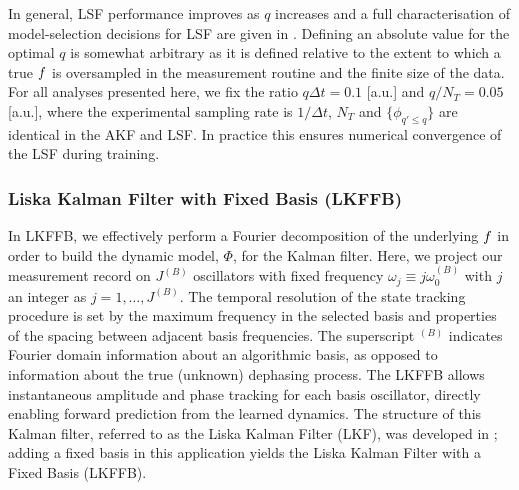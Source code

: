 In general, LSF performance improves as $q$ increases and a full characterisation of model-selection decisions for LSF are given in \cite{mavadia2017}. Defining an absolute value for the optimal $q$ is somewhat arbitrary as it is defined relative to the extent to which a true $f$ is oversampled in the measurement routine and the finite size of the data. For all analyses presented here, we fix the ratio $q \Delta t = 0.1 $ [a.u.] and $q / N_T = 0.05$ [a.u.], where the experimental sampling rate is $1/\Delta t$, $N_T$ and $\{\phi_{q' \leq q}\}$ are identical in the AKF and LSF.   In practice this ensures numerical convergence of the LSF during training.

\subsubsection{Liska Kalman Filter with Fixed Basis (LKFFB)}
In LKFFB, we effectively perform a Fourier decomposition of the underlying $f$ in order to build the dynamic model, $\Phi$, for the Kalman filter.   Here, we project our measurement record on $J^{(B)}$ oscillators with fixed frequency $\omega_{j}\equiv j\omega_0^{(B)}$ with $j$ an integer as $j = 1, \hdots, J^{(B)}$. The temporal resolution of the state tracking procedure is set by the maximum frequency in the selected basis and properties of the spacing between adjacent basis frequencies. The superscript $ ^{(B)}$ indicates Fourier domain information about an algorithmic basis, as opposed to information about the true (unknown) dephasing process.  The LKFFB allows instantaneous amplitude and phase tracking for each basis oscillator, directly enabling forward prediction from the learned dynamics.  The structure of this Kalman filter, referred to as the Liska Kalman Filter (LKF), was developed in \cite{livska2007}; adding a fixed basis in this application yields the Liska Kalman Filter with a Fixed Basis (LKFFB). 

